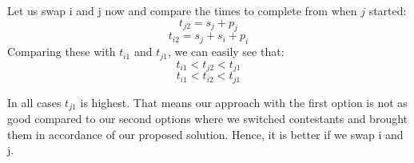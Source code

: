 \documentclass[11pt]{article}
\begin{document}
Let us swap i and j now and compare the times to complete from when $ j $ started:
\begin{equation*}
t_{j2} = s_j + p_j
\end{equation*}
\begin{equation*}
t_{i2} = s_j + s_i + p_i
\end{equation*}
Comparing these with $t_{i1} $ and $ t_{j1} $, we can easily see that:
\begin{equation*}
t_{i1} < t_{j2} < t_{j1}
\end{equation*}
\begin{equation*}
t_{i1} < t_{i2} < t_{j1}
\end{equation*}

In all cases $ t_{j1} $ is highest. That means our approach with the first option is not as good compared to our second options where we switched contestants and brought them in accordance of our proposed solution. Hence, it is better if we swap i and j.

\clearpage
\end{document}
